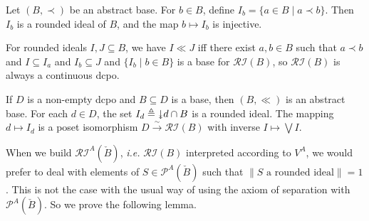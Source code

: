 \documentclass{lmcs}
\newcommand{\doubledownarrow}{\rotatebox[origin=c]{-90}{$\twoheadrightarrow$}}
\newcommand{\dd}{\doubledownarrow}
\newcommand{\powerset}{\ensuremath{\mathcal{P}}}
\newcommand{\apowerset}{\powerset^A}
\newcommand{\RI}{\mathcal{RI}} %
\newcommand{\defeq}{\mathrel{\triangleq}}
\newcommand{\isoarrow}{\stackrel{\sim}{\rightarrow}}
\newcommand{\bvs}[1]{\| {#1} \|}
\begin{document}
\begin{prop}
\label{AbstractBaseIsBaseProp}
Let $(B,\prec)$ be an abstract base. For $b \in B$, define $I_b = \{ a \in B \mid a \prec b \}$. Then $I_b$ is a rounded ideal of $B$, and the map $b \mapsto I_b$ is injective. 

For rounded ideals $I,J \subseteq B$, we have $I \ll J$ iff there exist $a,b \in B$ such that $a \prec b$ and $I \subseteq I_a$ and $I_b \subseteq J$ and $\{I_b \mid b \in B\}$ is a base for $\RI(B)$, so $\RI(B)$ is always a continuous dcpo. 

If $D$ is a non-empty dcpo and $B \subseteq D$ is a base, then $(B, \ll)$ is an abstract base. For each $d \in D$, the set $I_d \defeq \dd d \cap B$ is a rounded ideal. The mapping $d \mapsto I_d$ is a poset isomorphism $D \isoarrow \RI(B)$ with inverse $I \mapsto \bigvee I$. \qedhere
\end{prop}

When we build $\RI^A(\check{B})$, \emph{i.e.} $\RI(B)$ interpreted according to $V^A$, we would prefer to deal with elements of $S \in \apowerset(\check{B})$ such that $\bvs{S \text{ a rounded ideal}} = 1$. This is not the case with the usual way of using the axiom of separation with $\apowerset(\check{B})$. So we prove the following lemma.
\end{document}
